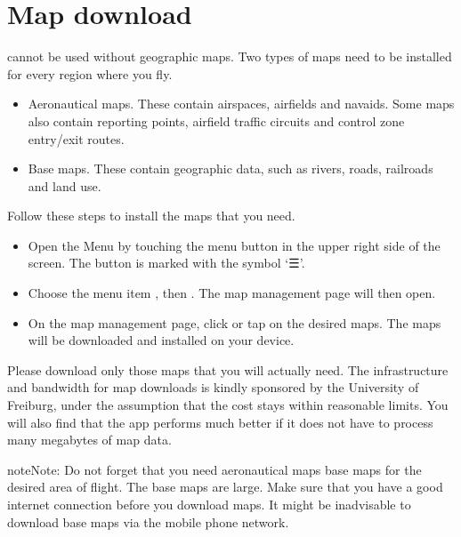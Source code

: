 \documentclass[letterpaper,10pt,english]{sphinxmanual}
\begin{document}
\section{Map download}
\label{\detokenize{01-intro/02-installation:map-download}}
\sphinxAtStartPar
{} cannot be used without geographic maps.  Two types
of maps need to be installed for every region where you fly.
\begin{itemize}
\item {} 
\sphinxAtStartPar
Aeronautical maps.  These contain airspaces, airfields and navaids.  Some maps
also contain reporting points, airfield traffic circuits and control zone
entry/exit routes.

\item {} 
\sphinxAtStartPar
Base maps.  These contain geographic data, such as rivers, roads, railroads
and land use.

\end{itemize}

\sphinxAtStartPar
Follow these steps to install the maps that you need.
\begin{itemize}
\item {} 
\sphinxAtStartPar
Open the Menu by touching the menu button in the upper right side of the
screen.  The button is marked with the symbol ‘☰’.

\item {} 
\sphinxAtStartPar
Choose the menu item , then .  The map management page will
then open.

\item {} 
\sphinxAtStartPar
On the map management page, click or tap on the desired maps.  The maps will
be downloaded and installed on your device.

\end{itemize}

\sphinxAtStartPar
Please download only those maps that you will actually need.  The infrastructure
and bandwidth for map downloads is kindly sponsored by the University of
Freiburg, under the assumption that the cost stays within reasonable limits.
You will also find that the app performs much better if it does not have to
process many megabytes of map data.

\begin{sphinxadmonition}{note}{Note:}
\sphinxAtStartPar
Do not forget that you need aeronautical maps  base maps for
the desired area of flight.  The base maps are large.  Make sure that you
have a good internet connection before you download maps.  It might be
inadvisable to download base maps via the mobile phone network.
\end{sphinxadmonition}
\end{document}
